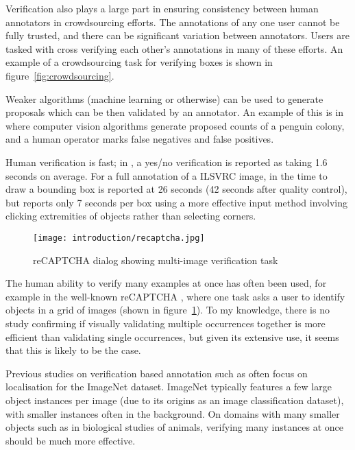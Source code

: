 Verification also plays a large part in ensuring consistency between human annotators in crowdsourcing efforts. The annotations of any one user cannot be fully trusted, and there can be significant variation between annotators. Users are tasked with cross verifying each other's annotations in many of these efforts. An example of a crowdsourcing task \cite{Su2012a} for verifying boxes is shown in figure~\ref{fig:crowdsourcing}.

Weaker algorithms (machine learning or otherwise) can be used to generate proposals which can be then validated by an annotator. An example of this is in \cite{McNeill2011} where computer vision algorithms generate proposed counts of a penguin colony, and a human operator marks false negatives and false positives.

Human verification is fast; in \cite{Papadopoulos2016}, a yes/no verification is reported as taking 1.6 seconds on average. For a full annotation of a \gls{ILSVRC} image, in \cite{Su2012a} the time to draw a bounding box is reported at 26 seconds (42 seconds after quality control), but \cite{Papadopoulos2017} reports only 7 seconds per box using a more effective input method involving clicking extremities of objects rather than selecting corners. 

\begin{figure}[h]
  \centering
  \texttt{[image: introduction/recaptcha.jpg]}
  \caption{reCAPTCHA dialog showing multi-image verification task}  
  \label{fig:captcha}
\end{figure}

The human ability to verify many examples at once has often been used, for example in the well-known reCAPTCHA \cite{von2008recaptcha}, where one task asks a user to identify objects in a grid of images (shown in figure~\ref{fig:captcha}). To my knowledge, there is no study confirming if visually validating multiple occurrences together is more efficient than validating single occurrences, but given its extensive use, it seems that this is likely to be the case.

Previous studies on verification based annotation such as \cite{Papadopoulos2016} often focus on localisation for the ImageNet dataset. ImageNet typically features a few large object instances per image (due to its origins as an image classification dataset), with smaller instances often in the background. On domains with many smaller objects such as in biological studies of animals, verifying many instances at once should be much more effective. 

